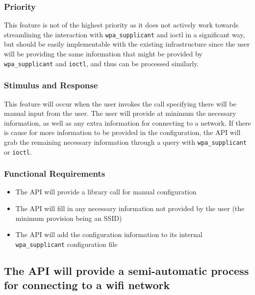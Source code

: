 \subsubsection{Priority}
This feature is not of the highest priority as it does not actively work towards streamlining
the interaction with \texttt{wpa\_supplicant} and ioctl in a significant way, but should be easily 
implementable with the existing infrastructure since the user will be providing the same
information that might be provided by \texttt{wpa\_supplicant} and \texttt{ioctl}, and thus can be processed
similarly.

\subsubsection{Stimulus and Response}
This feature will occur when the user invokes the call specifying there will be
manual input from the user. The user will provide at minimum the necessary information,
as well as any extra information for connecting to a network. If there is cause for more
information to be provided in the configuration, the API will grab the remaining necessary
information through a query with \texttt{wpa\_supplicant} or \texttt{ioctl}.

\subsubsection{Functional Requirements}

\begin{itemize}
  \item The API will provide a library call for manual configuration
  \item The API will fill in any necessary information not provided by the user
    (the minimum provision being an SSID)
  \item The API will add the configuration information to its internal \texttt{wpa\_supplicant}
    configuration file
\end{itemize}


\subsection{The API will provide a semi-automatic process for connecting to a wifi network}
